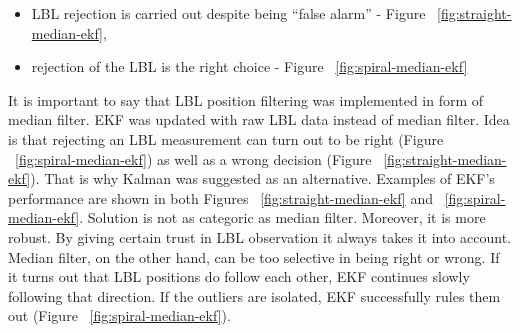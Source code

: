 \begin{itemize}
\item LBL rejection is carried out despite being ``false alarm'' - Figure ~\ref{fig:straight-median-ekf},
\item rejection of the LBL is the right choice - Figure ~\ref{fig:spiral-median-ekf}
\end{itemize}
It is important to say that LBL position filtering was implemented in form of median filter. EKF was updated with raw LBL data instead of median filter. Idea is that rejecting an LBL measurement can turn out to be right (Figure ~\ref{fig:spiral-median-ekf}) as well as a wrong decision (Figure ~\ref{fig:straight-median-ekf}). That is why Kalman was suggested as an alternative. Examples of EKF's performance  are shown in both Figures ~\ref{fig:straight-median-ekf} and ~\ref{fig:spiral-median-ekf}. Solution is not as categoric as median filter. Moreover, it is more robust. By giving certain trust in LBL observation it always takes it into account. Median filter, on the other hand, can be too selective in being right or wrong. If it turns out that LBL positions do follow each other, EKF continues slowly following that direction. If the outliers are isolated, EKF successfully rules them out (Figure ~\ref{fig:spiral-median-ekf}). 
\begin{figure}%
  \centering
\end{figure}
